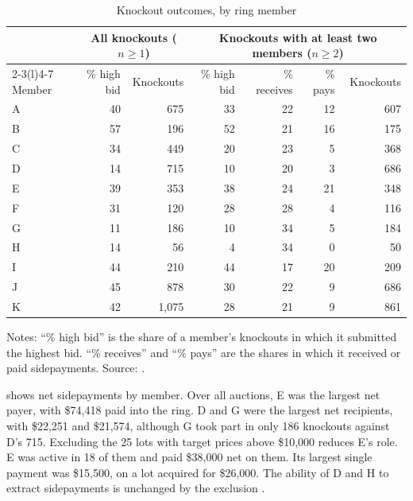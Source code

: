 \begin{table}[htbp]
\centering
\caption{Knockout outcomes, by ring member}
\label{tab:13-asker-t5}
\begin{threeparttable}
\begin{tabular}{@{}lrrrrrr@{}}
\toprule
 & \multicolumn{2}{c}{All knockouts ($n\ge1$)} & \multicolumn{4}{c}{Knockouts with at least two members ($n\ge2$)} \\
\cmidrule(lr){2-3}\cmidrule(l){4-7}
Member & \% high bid & Knockouts & \% high bid & \% receives & \% pays & Knockouts \\
\midrule
A & 40 & 675 & 33 & 22 & 12 & 607 \\
B & 57 & 196 & 52 & 21 & 16 & 175 \\
C & 34 & 449 & 20 & 23 & 5 & 368 \\
D & 14 & 715 & 10 & 20 & 3 & 686 \\
E & 39 & 353 & 38 & 24 & 21 & 348 \\
F & 31 & 120 & 28 & 28 & 4 & 116 \\
G & 11 & 186 & 10 & 34 & 5 & 184 \\
H & 14 & 56 & 4 & 34 & 0 & 50 \\
I & 44 & 210 & 44 & 17 & 20 & 209 \\
J & 45 & 878 & 30 & 22 & 9 & 686 \\
K & 42 & 1,075 & 28 & 21 & 9 & 861 \\
\bottomrule
\end{tabular}
\begin{tablenotes}\footnotesize
\item Notes: ``\% high bid'' is the share of a member's knockouts in which it submitted the highest bid.
``\% receives'' and ``\% pays'' are the shares in which it received or paid sidepayments. Source:
\citet[Table 5]{Asker2010}.
\end{tablenotes}
\end{threeparttable}
\end{table}

 shows net sidepayments by member. Over all auctions, E was the largest net payer, with
\$74,418 paid into the ring. D and G were the largest net recipients, with \$22,251 and \$21,574, although G
took part in only 186 knockouts against D's 715. Excluding the 25 lots with target prices above \$10,000 reduces
E's role. E was active in 18 of them and paid \$38,000 net on them. Its largest single payment was \$15,500, on
a lot acquired for \$26,000. The ability of D and H to extract sidepayments is unchanged by the exclusion
\citep[p.~740 and footnote 28]{Asker2010}.


